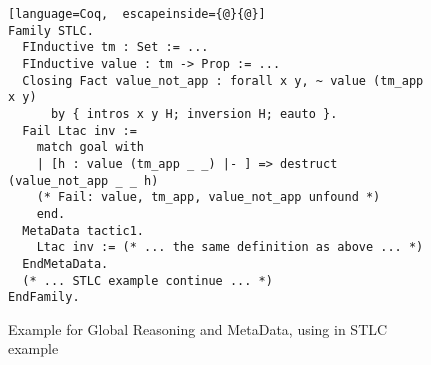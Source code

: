 



\begin{figure}[!htb]
\begin{lstlisting}[language=Coq,  escapeinside={@}{@}]
Family STLC.
  FInductive tm : Set := ... 
  FInductive value : tm -> Prop := ... 
  Closing Fact value_not_app : forall x y, ~ value (tm_app x y) 
      by { intros x y H; inversion H; eauto }.
  Fail Ltac inv := 
    match goal with 
    | [h : value (tm_app _ _) |- ] => destruct (value_not_app _ _ h)
    (* Fail: value, tm_app, value_not_app unfound *)
    end. 
  MetaData tactic1.
    Ltac inv := (* ... the same definition as above ... *)
  EndMetaData.
  (* ... STLC example continue ... *)
EndFamily.
\end{lstlisting}  
\caption{Example for Global Reasoning and MetaData, using in STLC example}\label{fig:plugin-example-global-reasoning-meta-data}
\end{figure}


